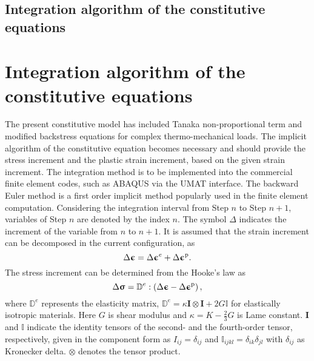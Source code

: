 \documentclass[preprint,5p,twocolumn,11pt,sort&compress]{elsarticle}
\newcommand{\bfsigma}{{\bm{\upsigma}}}
\newcommand{\bfepsilon}{{\bm{\upepsilon}}}
\begin{document}
\subsection{Integration algorithm of the constitutive equations}

\section{Integration algorithm of the constitutive equations}
\noindent
The present constitutive model has included Tanaka non-proportional term and modified backstress equations for complex thermo-mechanical loads. The implicit algorithm of the constitutive equation becomes necessary and should provide the stress increment and the plastic strain increment, based on the given strain increment. The integration method is to be implemented into the commercial finite element codes, such as ABAQUS via the UMAT interface.
The backward Euler method is a first order implicit method popularly used in the finite element computation. Considering the integration interval from Step $n$ to Step $n+1$, variables of Step $n$ are denoted by the index $n$. The symbol $\Delta$ indicates the increment of the variable from $n$ to $n+1$. It is assumed that the strain increment can be decomposed in the current configuration, as
\begin{equation}
{\Delta\bfepsilon} = \Delta\bfepsilon^e + \Delta\bfepsilon^{\rm p}.
\end{equation}
The stress increment can be determined from the Hooke's law as
\begin{equation}
\label{Equ:sigman+1}
\Delta\bfsigma= {\mathbb{D}^e}:\left( {{\Delta\bfepsilon} - \Delta\bfepsilon^{\rm p}} \right),
\end{equation}
where $\mathbb{D}^e$ represents the elasticity matrix, ${\mathbb{D}^e} = \kappa {\mathbf{I}} \otimes {\mathbf{I}} + 2G\mathbb{I}$ for elastically isotropic materials. Here $G$ is shear modulus and  $\kappa  = K - \frac{2}{3}G$  is Lame constant. ${\mathbf{I}}$ and $\mathbb{I}$ indicate the identity tensors of the second- and the fourth-order tensor, respectively, given in the component form as ${I_{ij}} = {\delta _{ij}}$ and ${\mathbb{I}_{ijkl}} = {\delta _{ik}}{\delta _{jl}}$ with ${\delta _{ij}}$ as Kronecker delta. $\otimes$ denotes the tensor product.
\end{document}
